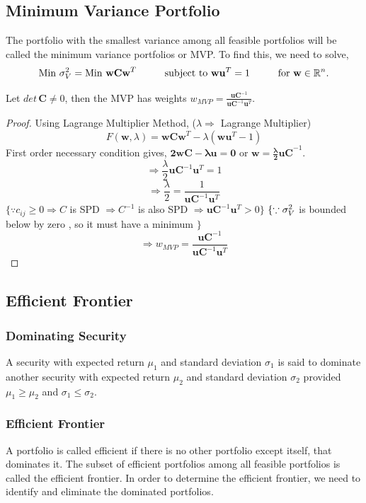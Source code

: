 \subsection{Minimum Variance Portfolio}
The portfolio with the smallest variance among all feasible portfolios will be called the minimum variance portfolios or MVP. To find this, we need to solve,
\begin{equation}
    \text{Min }\sigma_{V}^2=\text{Min }\mathbf{wCw}^{T} \hspace{10mm} \text{subject to } \mathbf{wu}^{T}=1 \hspace{10mm} \text{for }\mathbf{w} \in \mathbb{R}^{n}.
\end{equation}

\begin{theorem}
    Let $det \, \mathbf{C} \neq 0$, then the MVP has weights $w_{MVP}=\frac{\mathbf{uC}^{-1}}{\mathbf{uC}^{-1}\mathbf{u}^{T}}$. 
\end{theorem}
\begin{proof}
Using Lagrange Multiplier Method, ($\lambda \Rightarrow$ Lagrange Multiplier)
$$F(\mathbf{w},\lambda)=\mathbf{wCw}^{T}-\lambda(\mathbf{wu}^{T}-1)$$
First order necessary condition gives, $\mathbf{2wC-\lambda u=0}$ or $\mathbf{w=\frac{\lambda}{2}uC}^{-1}$.
$$\Rightarrow \frac{\lambda}{2}\mathbf{uC}^{-1}\mathbf{u}^{T}=1$$
$$\Rightarrow \frac{\lambda}{2}=\frac{1}{\mathbf{uC}^{-1}\mathbf{u}^{T}}$$
$\{\because c_{ij} \geq 0 \Rightarrow C$ is SPD $\Rightarrow C^{-1}$ is also SPD $\Rightarrow \mathbf{uC}^{-1}\mathbf{u}^{T}>0\}$
$\\\{\because \sigma_{V}^{2}$ is bounded below by zero , so it must have a minimum $\}$
$$\Rightarrow w_{MVP}=\frac{\mathbf{uC}^{-1}}{\mathbf{uC}^{-1}\mathbf{u}^{T}}$$
\end{proof}
\subsection{Efficient Frontier}
\subsubsection{Dominating Security}
A security with expected return $\mu_{1}$ and standard deviation $\sigma_{1}$ is said to dominate another security with expected return $\mu_{2}$ and standard deviation $\sigma_{2}$ provided $\mu_{1}\geq\mu_{2}$ and $\sigma_{1}\leq\sigma_{2}$.
\subsubsection{Efficient Frontier}
A portfolio is called efficient if there is no other portfolio except itself, that dominates it. The subset of efficient portfolios among all feasible portfolios is called the efficient frontier. In order to determine the efficient frontier, we need to identify and eliminate the dominated portfolios.
